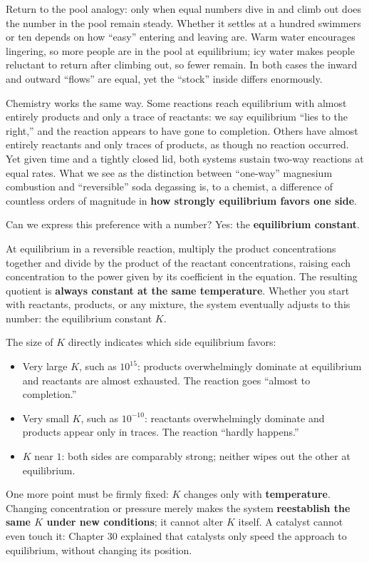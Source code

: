 Return to the pool analogy: only when equal numbers dive in and climb out does the number in the pool remain steady. Whether it settles at a hundred swimmers or ten depends on how ``easy'' entering and leaving are. Warm water encourages lingering, so more people are in the pool at equilibrium; icy water makes people reluctant to return after climbing out, so fewer remain. In both cases the inward and outward ``flows'' are equal, yet the ``stock'' inside differs enormously.

Chemistry works the same way. Some reactions reach equilibrium with almost entirely products and only a trace of reactants: we say equilibrium ``lies to the right,'' and the reaction appears to have gone to completion. Others have almost entirely reactants and only traces of products, as though no reaction occurred. Yet given time and a tightly closed lid, both systems sustain two-way reactions at equal rates. What we see as the distinction between ``one-way'' magnesium combustion and ``reversible'' soda degassing is, to a chemist, a difference of countless orders of magnitude in \textbf{how strongly equilibrium favors one side}.

Can we express this preference with a number? Yes: the \textbf{equilibrium constant}.

\begin{qiaoliang}
At equilibrium in a reversible reaction, multiply the product concentrations together and divide by the product of the reactant concentrations, raising each concentration to the power given by its coefficient in the equation. The resulting quotient is \textbf{always constant at the same temperature}. Whether you start with reactants, products, or any mixture, the system eventually adjusts to this number: the equilibrium constant $K$.

The size of $K$ directly indicates which side equilibrium favors:
\begin{itemize}[itemsep=2pt]
\item Very large $K$, such as $10^{15}$: products overwhelmingly dominate at equilibrium and reactants are almost exhausted. The reaction goes ``almost to completion.''
\item Very small $K$, such as $10^{-10}$: reactants overwhelmingly dominate and products appear only in traces. The reaction ``hardly happens.''
\item $K$ near $1$: both sides are comparably strong; neither wipes out the other at equilibrium.
\end{itemize}
One more point must be firmly fixed: $K$ changes only with \textbf{temperature}. Changing concentration or pressure merely makes the system \textbf{reestablish the same $K$ under new conditions}; it cannot alter $K$ itself. A catalyst cannot even touch it: Chapter 30 explained that catalysts only speed the approach to equilibrium, without changing its position.
\end{qiaoliang}

